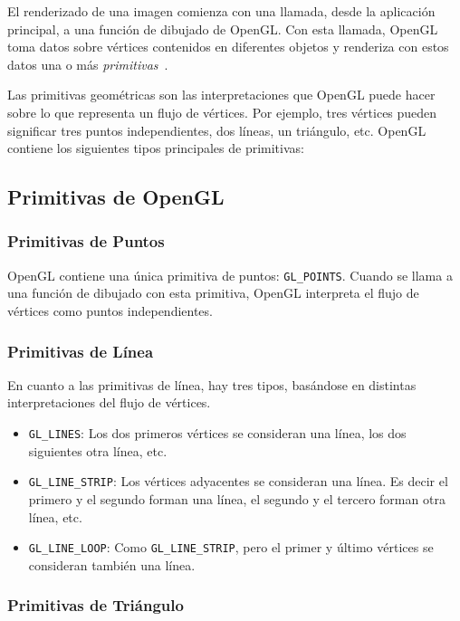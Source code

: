 El renderizado de una imagen comienza con una llamada, desde la aplicación
principal, a una función de dibujado de OpenGL. Con esta llamada, OpenGL toma
datos sobre vértices contenidos en diferentes objetos y renderiza con estos
datos una o más \textit{primitivas}~\cite{Primitivas}. 

Las primitivas geométricas son las interpretaciones que OpenGL puede
hacer sobre lo que representa un flujo de vértices. Por ejemplo, tres vértices
pueden significar tres puntos independientes, dos líneas, un triángulo, etc.
OpenGL contiene los siguientes tipos principales de primitivas:

\subsection{Primitivas de OpenGL}
\label{ref:primitives}


\subsubsection{Primitivas de Puntos}
\label{ref:points}

OpenGL contiene una única primitiva de puntos: \verb|GL_POINTS|. Cuando se llama
a una función de dibujado con esta primitiva, OpenGL interpreta el flujo de
vértices como puntos independientes.

\subsubsection{Primitivas de Línea}
\label{ref:lines}

En cuanto a las primitivas de línea, hay tres tipos, basándose en distintas
interpretaciones del flujo de vértices.

\begin{itemize}
		\item \verb|GL_LINES|: Los dos primeros vértices se consideran una línea,
				los dos siguientes otra línea, etc.
		\item \verb|GL_LINE_STRIP|: Los vértices adyacentes se consideran una
			línea. Es decir el primero y el segundo forman una línea, el segundo
			y el tercero forman otra línea, etc.
		\item \verb|GL_LINE_LOOP|: Como \verb|GL_LINE_STRIP|, pero el primer y
				último vértices se consideran también una línea.
\end{itemize}

\subsubsection{Primitivas de Triángulo}
\label{ref:triangles}

